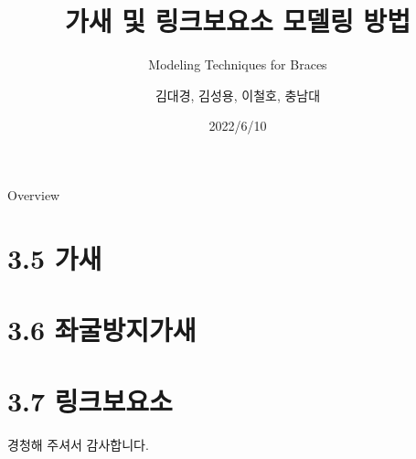 \documentclass[serif,9pt]{beamer}
\title{가새 및 링크보요소 모델링 방법}
\subtitle{\small{Modeling Techniques for Braces}}
\author{김대경\inst{1}, 김성용\inst{2}, 이철호\inst{3}, 충남대\inst{4}}
\institute[CWNU] %
{
	\inst{1}%
	조교수, 울산대학교 건축학부 \and
	\inst{2}%
	조교수, 창원대학교 건축공학과 \and
	\inst{3}%
	교수, 서울대학교 건축학과 \and
	\inst{4}
	교수, 충남대학교 건축학과
}
\date{2022/6/10}
\begin{document}
\begin{frame}
	\titlepage
\end{frame}

\begin{frame}{Overview}
\tableofcontents
\end{frame}

\section{3.5 가새}	

	
\section{3.6 좌굴방지가새}


\section{3.7 링크보요소}


	\begin{frame}
		경청해 주셔서 감사합니다. 
	\end{frame}
\end{document}
